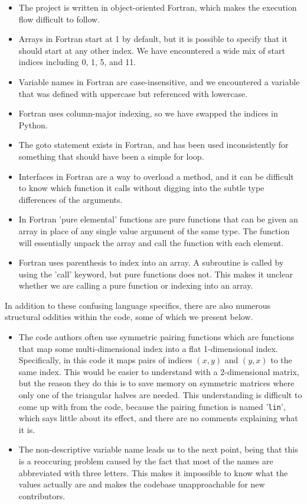 \begin{itemize}
        \item The project is written in object-oriented Fortran, which makes the execution flow difficult to follow.
        \item Arrays in Fortran start at 1 by default, but it is possible to specify that it should start at any other index. We have encountered a wide mix of start indices including 0, 1, 5, and 11.
        \item Variable names in Fortran are case-insensitive, and we encountered a variable that was defined with uppercase but referenced with lowercase.
        \item Fortran uses column-major indexing, so we have swapped the indices in Python.
        \item The goto statement exists in Fortran, and has been used inconsistently for something that should have been a simple for loop.
        \item Interfaces in Fortran are a way to overload a method, and it can be difficult to know which function it calls without digging into the subtle type differences of the arguments.
        \item In Fortran 'pure elemental' functions are pure functions that can be given an array in place of any single value argument of the same type. The function will essentially unpack the array and call the function with each element.
        \item Fortran uses parenthesis to index into an array. A subroutine is called by using the 'call' keyword, but pure functions does not. This makes it unclear whether we are calling a pure function or indexing into an array.
\end{itemize}

In addition to these confusing language specifics, there are also numerous structural oddities within the code, some of which we present below.

\begin{itemize}
        \item The code authors often use symmetric pairing functions which are functions that map some multi-dimensional index into a flat 1-dimensional index. Specifically, in this code it maps pairs of indices $(x,y)$ and $(y,x)$ to the same index. This would be easier to understand with a 2-dimensional matrix, but the reason they do this is to save memory on symmetric matrices where only one of the triangular halves are needed. This understanding is difficult to come up with from the code, because the pairing function is named '\verb|lin|', which says little about its effect, and there are no comments explaining what it is.
        \item The non-descriptive variable name leads us to the next point, being that this is a reoccuring problem caused by the fact that most of the names are abbreviated with three letters. This makes it impossible to know what the values actually are and makes the codebase unapproachable for new contributors.
\end{itemize}

